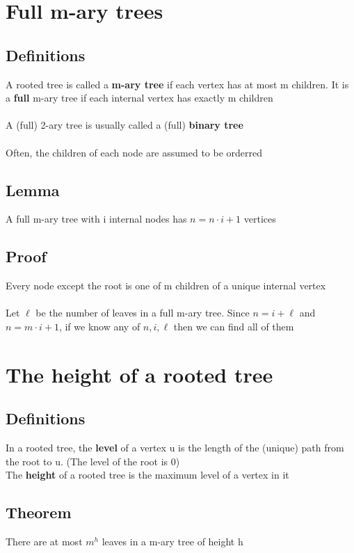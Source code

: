 \documentclass{article}[18pt]
\begin{document}
\section{Full m-ary trees}
\subsection{Definitions}
A rooted tree is called a \textbf{m-ary tree} if each vertex has at most m children. It is a \textbf{full} m-ary tree if each internal vertex has exactly m children\\
\\
A (full) 2-ary tree is usually called a (full) \textbf{binary tree}\\
\\
Often, the children of each node are assumed to be orderred
\subsection{Lemma} 
A full m-ary tree with i internal nodes has $n=n\cdot i+1$ vertices
\subsection{Proof}
Every node except the root is one of m children of a unique internal vertex\\
\\
Let $\ell$ be the number of leaves in a full m-ary tree. Since $n=i+\ell$ and $n=m\cdot i+1$, if we know any of $n,i,\ell$ then we can find all of them
\section{The height of a rooted tree}
\subsection{Definitions}
In a rooted tree, the \textbf{level} of a vertex u is the length of the (unique) path from the root to u. (The level of the root is 0)\\
The \textbf{height} of a rooted tree is the maximum level of a vertex in it
\subsection{Theorem}
There are at most $m^h$ leaves in a m-ary tree of height h
\end{document}
